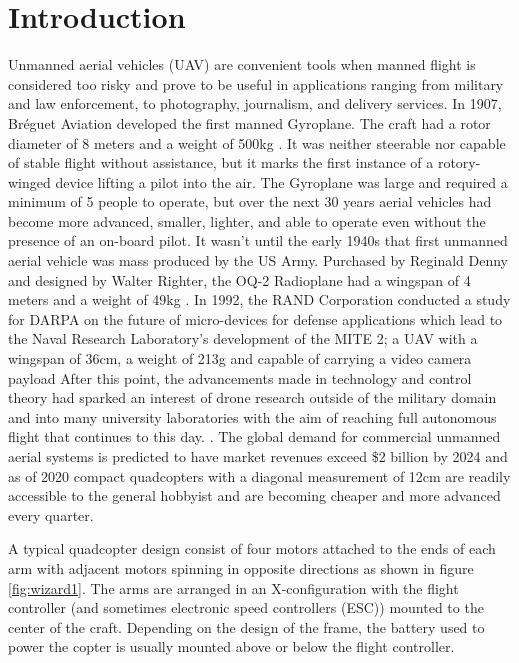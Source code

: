 \documentclass[11pt]{ucthesis}
\begin{document}
\section*{Introduction}
Unmanned aerial vehicles (UAV) are convenient tools when manned flight is considered too risky and prove to be useful in applications ranging from military and law enforcement, to photography, journalism, and delivery services. In 1907, Bréguet Aviation developed the first manned Gyroplane. The craft had a rotor diameter of 8 meters and a weight of 500kg \cite{ghazbi2016quadrotors}. It was neither steerable nor capable of stable flight without assistance, but it marks the first instance of a rotory-winged device lifting a pilot into the air. The Gyroplane was large and required a minimum of 5 people to operate, but over the next 30 years aerial vehicles had become more advanced, smaller, lighter, and able to operate even without the presence of an on-board pilot. It wasn't until the early 1940s that first unmanned aerial vehicle was mass produced by the US Army. Purchased by Reginald Denny and designed by Walter Righter, the OQ-2 Radioplane had a wingspan of 4 meters and a weight of 49kg \cite{parker2013building}.  In 1992, the RAND Corporation conducted a study for DARPA on the future of micro-devices for defense applications \cite{hundley1994future} which lead to the Naval Research Laboratory's development of the MITE 2; a UAV with a wingspan of 36cm, a weight of 213g and capable of carrying a video camera payload \cite{mueller2009birth} After this point, the advancements made in technology and control theory had sparked an interest of drone research outside of the military domain and into many university laboratories with the aim of reaching full autonomous flight that continues to this day. \cite{tournier2006estimation, wierema2008design, bouabdallah2004design}. The global demand for commercial unmanned aerial systems is predicted to have market revenues exceed \$2 billion by 2024 \cite{foster2019} and as of 2020 compact quadcopters with a diagonal measurement of 12cm are readily accessible to the general hobbyist and are becoming cheaper and more advanced every quarter. 

A typical quadcopter design consist of four motors attached to the ends of each arm with adjacent motors spinning in opposite directions as shown in figure \ref{fig:wizard1}. The arms are arranged in an X-configuration with the flight controller (and sometimes electronic speed controllers (ESC)) mounted to the center of the craft. Depending on the design of the frame, the battery used to power the copter is usually mounted above or below the flight controller. 
\end{document}
